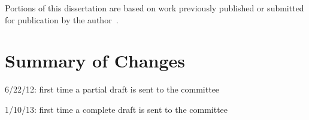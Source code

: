 

\ifperchapterbib%
\else\fi%
Portions of this dissertation are based on work previously published or submitted for publication by the author~\citep{asmuth09,asmuth11}.
%
\ifchangebars%
\section*{\protect{\cbstart}Summary of Changes}%
\begin{list}{}{\topsep 0pt%
               \baselineskip}%
\item 6/22/12: first time a partial draft is sent to the committee
\item 1/10/13: first time a complete draft is sent to the committee
\end{list}%
\cbend%
\else\fi%